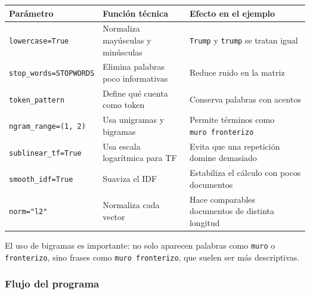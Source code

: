 \documentclass[
  spanish,
  letterpaper,
  DIV=11,
  numbers=noendperiod]{scrartcl}
\begin{document}
\begin{longtable}[]{@{}
  >{\raggedright\arraybackslash}p{}
  >{\raggedright\arraybackslash}p{}
  >{\raggedright\arraybackslash}p{}@{}}
\toprule\noalign{}
\begin{minipage}[b]{\linewidth}\raggedright
Parámetro
\end{minipage} & \begin{minipage}[b]{\linewidth}\raggedright
Función técnica
\end{minipage} & \begin{minipage}[b]{\linewidth}\raggedright
Efecto en el ejemplo
\end{minipage} \\
\midrule\noalign{}
\endhead
\bottomrule\noalign{}
\endlastfoot
\texttt{lowercase=True} & Normaliza mayúsculas y minúsculas &
\texttt{Trump} y \texttt{trump} se tratan igual \\
\texttt{stop\_words=STOPWORDS} & Elimina palabras poco informativas &
Reduce ruido en la matriz \\
\texttt{token\_pattern} & Define qué cuenta como token & Conserva
palabras con acentos \\
\texttt{ngram\_range=(1,\ 2)} & Usa unigramas y bigramas & Permite
términos como \texttt{muro\ fronterizo} \\
\texttt{sublinear\_tf=True} & Usa escala logarítmica para TF & Evita que
una repetición domine demasiado \\
\texttt{smooth\_idf=True} & Suaviza el IDF & Estabiliza el cálculo con
pocos documentos \\
\texttt{norm="l2"} & Normaliza cada vector & Hace comparables documentos
de distinta longitud \\
\end{longtable}

\begin{tcolorbox}[enhanced jigsaw, breakable, rightrule=.15mm, leftrule=.75mm, opacityback=0, arc=.35mm, colframe=quarto-callout-tip-color-frame, toprule=.15mm, left=2mm, colback=white, bottomrule=.15mm]

El uso de bigramas es importante: no solo aparecen palabras como
\texttt{muro} o \texttt{fronterizo}, sino frases como
\texttt{muro\ fronterizo}, que suelen ser más descriptivas.

\end{tcolorbox}

\subsubsection{Flujo del programa}\label{flujo-del-programa}
\end{document}
